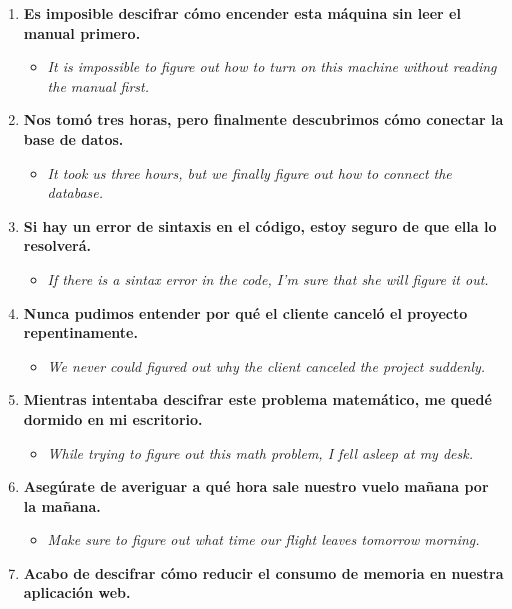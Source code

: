 \documentclass[
10pt, %
a4paper, %
oneside, %
headinclude,footinclude, %
BCOR5mm, %
]{scrartcl}
\begin{document}
\begin{enumerate}
\begin{itemize}
		\item \textit{I need you to figure out why the server failed last night.}
	\end{itemize}
	\item \textbf{ Es imposible descifrar cómo encender esta máquina sin leer el manual primero.}
	\begin{itemize}
		\item \textit{It is impossible to figure out how to turn on this machine without reading the manual first.}
	\end{itemize}
	\item \textbf{Nos tomó tres horas, pero finalmente descubrimos cómo conectar la base de datos.}
	\begin{itemize}
		\item \textit{It took us three hours, but we finally figure out how to connect the database.}
	\end{itemize}
	\item \textbf{Si hay un error de sintaxis en el código, estoy seguro de que ella lo resolverá.}
	\begin{itemize}
		\item \textit{If there is a sintax error in the code, I'm sure that she will figure it out.}
	\end{itemize}
	\item \textbf{Nunca pudimos entender por qué el cliente canceló el proyecto repentinamente.}
	\begin{itemize}
		\item \textit{We never could figured out why the client canceled the project suddenly.}
	\end{itemize}
	\item \textbf{Mientras intentaba descifrar este problema matemático, me quedé dormido en mi escritorio.}
	\begin{itemize}
		\item \textit{While trying to figure out this math problem, I fell asleep at my desk.}
	\end{itemize}
	\item \textbf{Asegúrate de averiguar a qué hora sale nuestro vuelo mañana por la mañana.}
	\begin{itemize}
		\item \textit{Make sure to figure out what time our flight leaves tomorrow morning.}
	\end{itemize}
	\item \textbf{Acabo de descifrar cómo reducir el consumo de memoria en nuestra aplicación web.}

\end{enumerate}
\end{document}
